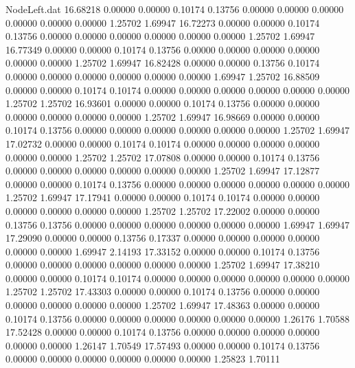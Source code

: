 \begin{filecontents}{NodeLeft.dat}
  16.68218    0.00000    0.00000     0.10174    0.13756    0.00000    0.00000    0.00000    0.00000    0.00000    0.00000    1.25702    1.69947
  16.72273    0.00000    0.00000     0.10174    0.13756    0.00000    0.00000    0.00000    0.00000    0.00000    0.00000    1.25702    1.69947
  16.77349    0.00000    0.00000     0.10174    0.13756    0.00000    0.00000    0.00000    0.00000    0.00000    0.00000    1.25702    1.69947
  16.82428    0.00000    0.00000     0.13756    0.10174    0.00000    0.00000    0.00000    0.00000    0.00000    0.00000    1.69947    1.25702
  16.88509    0.00000    0.00000     0.10174    0.10174    0.00000    0.00000    0.00000    0.00000    0.00000    0.00000    1.25702    1.25702
  16.93601    0.00000    0.00000     0.10174    0.13756    0.00000    0.00000    0.00000    0.00000    0.00000    0.00000    1.25702    1.69947
  16.98669    0.00000    0.00000     0.10174    0.13756    0.00000    0.00000    0.00000    0.00000    0.00000    0.00000    1.25702    1.69947
  17.02732    0.00000    0.00000     0.10174    0.10174    0.00000    0.00000    0.00000    0.00000    0.00000    0.00000    1.25702    1.25702
  17.07808    0.00000    0.00000     0.10174    0.13756    0.00000    0.00000    0.00000    0.00000    0.00000    0.00000    1.25702    1.69947
  17.12877    0.00000    0.00000     0.10174    0.13756    0.00000    0.00000    0.00000    0.00000    0.00000    0.00000    1.25702    1.69947
  17.17941    0.00000    0.00000     0.10174    0.10174    0.00000    0.00000    0.00000    0.00000    0.00000    0.00000    1.25702    1.25702
  17.22002    0.00000    0.00000     0.13756    0.13756    0.00000    0.00000    0.00000    0.00000    0.00000    0.00000    1.69947    1.69947
  17.29090    0.00000    0.00000     0.13756    0.17337    0.00000    0.00000    0.00000    0.00000    0.00000    0.00000    1.69947    2.14193
  17.33152    0.00000    0.00000     0.10174    0.13756    0.00000    0.00000    0.00000    0.00000    0.00000    0.00000    1.25702    1.69947
  17.38210    0.00000    0.00000     0.10174    0.10174    0.00000    0.00000    0.00000    0.00000    0.00000    0.00000    1.25702    1.25702
  17.43303    0.00000    0.00000     0.10174    0.13756    0.00000    0.00000    0.00000    0.00000    0.00000    0.00000    1.25702    1.69947
  17.48363    0.00000    0.00000     0.10174    0.13756    0.00000    0.00000    0.00000    0.00000    0.00000    0.00000    1.26176    1.70588
  17.52428    0.00000    0.00000     0.10174    0.13756    0.00000    0.00000    0.00000    0.00000    0.00000    0.00000    1.26147    1.70549
  17.57493    0.00000    0.00000     0.10174    0.13756    0.00000    0.00000    0.00000    0.00000    0.00000    0.00000    1.25823    1.70111

\end{filecontents}
